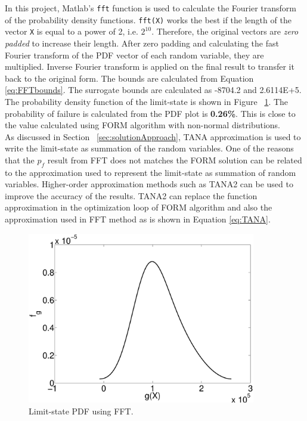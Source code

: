 \documentclass[paper=a4, fontsize=12pt]{scrartcl} %
\begin{document}
In this project, Matlab's \texttt{fft} function is used to calculate the Fourier transform of the probability density functions. \texttt{fft(X)} works the best if the length of the vector \texttt{X} is equal to a power of 2, i.e. $2^10$. Therefore, the original vectors are \emph{zero padded} to increase their length. After zero padding and calculating the fast Fourier transform of the PDF vector of each random variable, they are multiplied. Inverse Fourier transform is applied on the final result to transfer it back to the original form. The bounds are calculated from Equation \eqref{eq:FFTbounds}. The surrogate bounds are calculated as -8704.2 and 2.6114E+5. The probability density function of the limit-state is shown in Figure ~\ref{fig:FFT_result}. The probability of failure is calculated from the PDF plot is \textbf{0.26\%}. This is close to the value calculated using FORM algorithm with non-normal distributions.\\

As discussed in Section ~\ref{sec:solutionApproach}, TANA approximation is used to write the limit-state as summation of the random variables. One of the reasons that the $p_f$ result from FFT does not matches the FORM solution can be related to the approximation used to represent the limit-state as summation of random variables. Higher-order approximation methods such as TANA2 can be used to improve the accuracy of the results. TANA2 can replace the function approximation in the optimization loop of FORM algorithm and also the approximation used in FFT method as is shown in Equation \eqref{eq:TANA}.
%
\begin{figure}[H]
	\centering
	\includegraphics[height=7.5cm]{FFT.eps}
	\caption{Limit-state PDF using FFT.}
	\label{fig:FFT_result}
\end{figure}
%
\end{document}

